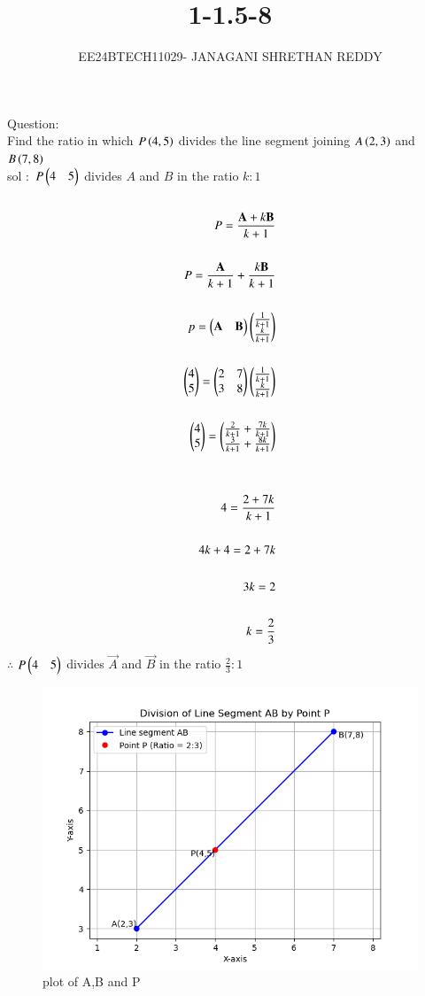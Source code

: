 \documentclass[journal,12pt,onecolumn]{IEEEtran}
\theoremstyle{remark}
\begin{document}
 


\vspace{3cm}

\title{1-1.5-8}
\author{EE24BTECH11029- JANAGANI SHRETHAN REDDY}
\maketitle
\bigskip
\renewcommand{\thefigure}{\theenumi}
\renewcommand{\thetable}{\theenumi}

Question$\colon$\\
     Find the ratio in which $P\left(4,5\right)$ divides the line segment joining $A\left(2,3\right)$ and $B\left(7,8\right)$\\

sol $\colon$  $P\begin{pmatrix}4&5\end{pmatrix}$ divides $A$ and $B$ in the ratio $k\colon1$\\\\
\begin{align}
    P=\frac{\vec{A}+k\vec{B}}{k+1}\\\\
P=\frac{\vec{A}}{k+1}+\frac{k\vec{B}}{k+1}\\\\
p=\myvec{\Vec{A}&\Vec{B}}\myvec{\frac{1}{k+1}\\\frac{k}{k+1}}\\\\
\myvec{4\\5}=\myvec{2&7\\3&8}\myvec{\frac{1}{k+1}\\\frac{k}{k+1}}\\\\
\myvec{4\\5}=\myvec{\frac{2}{k+1}+\frac{7k}{k+1}\\\frac{3}{k+1}+\frac{8k}{k+1}}\\\\\\
4=\frac{2+7k}{k+1}\\\\
4k+4=2+7k\\\\
3k=2\\\\
k=\frac{2}{3}\\
\end{align}
 $\therefore$ $P\begin{pmatrix}4&5\end{pmatrix}$ divides $\vec{A}$ and $\vec{B}$ in the ratio $\frac{2}{3}\colon1$
 \begin{figure}[!ht]
 \centering
 \includegraphics[width=1\linewidth]{fig.png}
 \caption{plot of A,B and P}
 \label{fig:enter-label}
 \end{figure}
 
\end{document}
